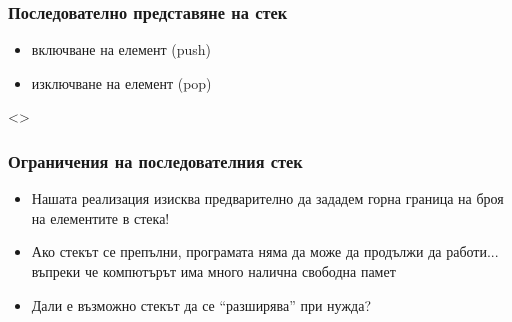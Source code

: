 \documentclass[alsotrans, beameroptions={aspectratio=169}]{beamerswitch}
\begin{document}
\begin{frame}
  \frametitle{Последователно представяне на стек}

  \begin{center}
  \end{center}

  \begin{itemize}
  \item<2-> включване на елемент (push)
  \item<3-> изключване на елемент (pop)
  \end{itemize}
\end{frame}

\begin{frame}<>
  \frametitle{Ограничения на последователния стек}

  \begin{itemize}[<+->]
  \item Нашата реализация изисква предварително да зададем горна граница на броя на елементите в стека!
  \item Ако стекът се препълни, програмата няма да може да продължи да работи... въпреки че компютърът има много налична свободна памет
  \item Дали е възможно стекът да се ``разширява'' при нужда?
  \end{itemize}
\end{frame}

\end{document}
